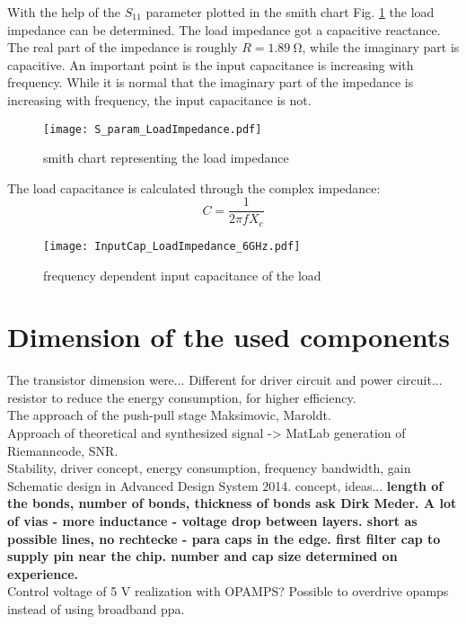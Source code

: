 With the help of the $S_{11}$ parameter plotted in the smith chart Fig. \ref{fig:smith_load_impedance} the load impedance can be determined.
The load impedance got a capacitive reactance.
 The real part of the impedance is roughly $R = \SI{1.89}{\ohm}$, while the imaginary part is capacitive. An important point is the input capacitance is increasing with frequency. While it is normal that the imaginary part of the impedance is increasing with frequency, the input capacitance is not.

 \begin{figure}[ht]
	\centering
  \texttt{[image: S\_param\_LoadImpedance.pdf]}
	\caption{smith chart representing the load impedance}
	\label{fig:smith_load_impedance}
\end{figure}

The load capacitance is calculated through the complex impedance:
\begin{equation}
C = \frac{1}{2 \pi f X_c}
\end{equation}

 \begin{figure}[ht]
	\centering
  \texttt{[image: InputCap\_LoadImpedance\_6GHz.pdf]}
	\caption{frequency dependent input capacitance of the load}
	\label{fig:smith_load_impedance_inC}
\end{figure}

\section{Dimension of the used components}
The transistor dimension were... Different for driver circuit and power circuit... resistor to reduce the energy  consumption, for higher efficiency. \\ The
approach of the push-pull stage Maksimovic, Maroldt.\\
Approach of theoretical and synthesized signal -> MatLab generation of Riemanncode, SNR.\\ Stability, driver concept, energy consumption, frequency bandwidth, gain
Schematic design in Advanced Design System 2014. concept, ideas... 
\textbf{length of the bonds, number of bonds, thickness of bonds ask Dirk Meder. A lot of vias - more inductance - voltage drop between layers. short as possible lines, no rechtecke - para caps in the edge. first filter cap to supply pin near the chip. number and cap size determined on experience. }\\
Control voltage of 5 V realization with OPAMPS? Possible to overdrive opamps instead of using broadband ppa. 



